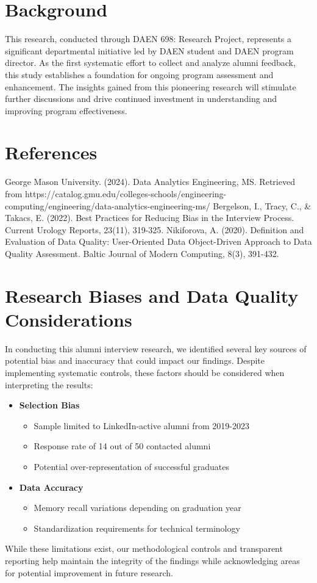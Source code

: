 \documentclass[12pt,a4paper]{article}
\begin{document}
\begin{appendices}
\section{Background}
This research, conducted through DAEN 698: Research Project, represents a significant departmental initiative led by DAEN student and DAEN program director. As the first systematic effort to collect and analyze alumni feedback, this study establishes a foundation for ongoing program assessment and enhancement. The insights gained from this pioneering research will stimulate further discussions and drive continued investment in understanding and improving program effectiveness.

\section{References}
\begin{thebibliography}{9}
 George Mason University. (2024). Data Analytics Engineering, MS. Retrieved from https://catalog.gmu.edu/colleges-schools/engineering-computing/engineering/data-analytics-engineering-ms/
 Bergelson, I., Tracy, C., \& Takacs, E. (2022). Best Practices for Reducing Bias in the Interview Process. Current Urology Reports, 23(11), 319-325.
 Nikiforova, A. (2020). Definition and Evaluation of Data Quality: User-Oriented Data Object-Driven Approach to Data Quality Assessment. Baltic Journal of Modern Computing, 8(3), 391-432.
\end{thebibliography}

\section{Research Biases and Data Quality Considerations}
In conducting this alumni interview research, we identified several key sources of potential bias and inaccuracy that could impact our findings. Despite implementing systematic controls, these factors should be considered when interpreting the results:
\begin{itemize}
\item \textbf{Selection Bias}
\begin{itemize}
\item Sample limited to LinkedIn-active alumni from 2019-2023
\item Response rate of 14 out of 50 contacted alumni
\item Potential over-representation of successful graduates
\end{itemize}
\item \textbf{Data Accuracy}
\begin{itemize}
\item Memory recall variations depending on graduation year
\item Standardization requirements for technical terminology
\end{itemize}
\end{itemize}
While these limitations exist, our methodological controls and transparent reporting help maintain the integrity of the findings while acknowledging areas for potential improvement in future research.

\end{appendices}
\end{document}
